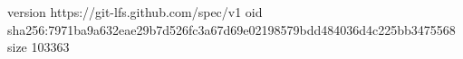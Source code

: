version https://git-lfs.github.com/spec/v1
oid sha256:7971ba9a632eae29b7d526fc3a67d69e02198579bdd484036d4c225bb3475568
size 103363
